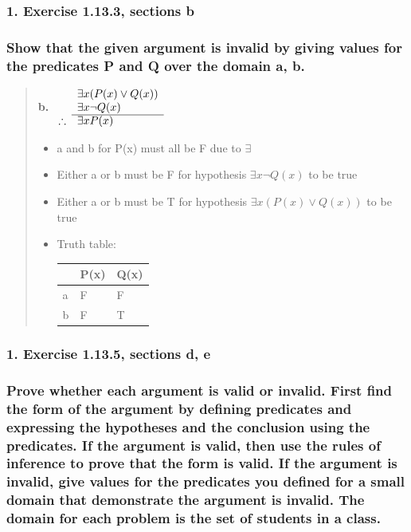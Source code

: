 \documentclass[11pt, oneside]{article}
\begin{document}
\subsubsection*{1. Exercise 1.13.3, sections b}

\subsubsection*{Show that the given argument is invalid by giving values for the predicates P and Q over the domain {a, b}.}

\begin{quote}
    \textbf{b. }
    \(
    \begin{array}{rl}
      & \exists x (P(x) \lor Q(x)) \\
      & \exists x \neg Q(x) \\
      \cline{2-2}
    \therefore & \exists x P(x)  
    \end{array}
    \)  
    
    \begin{itemize}
        \item a and b for P(x) must all be F due to $\exists$
        \item Either a or b must be F for hypothesis $\exists x \neg Q(x)$ to be true
        \item Either a or b must be T for hypothesis $\exists x (P(x) \lor Q(x))$ to be true
        \item Truth table:
            \begin{tabular}{ |p{0.5cm}|p{1cm}|p{1cm}|  }
                \hline
                \enspace & P(x) & Q(x) \\
                \hline
                a & F & F \\
                b & F & T \\
                \hline
            \end{tabular}
    \end{itemize}
\end{quote}

\pagebreak

\subsubsection*{1. Exercise 1.13.5, sections d, e}

\subsubsection*{Prove whether each argument is valid or invalid. First find the form of the argument by defining predicates and expressing the hypotheses and the conclusion using the predicates. If the argument is valid, then use the rules of inference to prove that the form is valid. If the argument is invalid, give values for the predicates you defined for a small domain that demonstrate the argument is invalid. The domain for each problem is the set of students in a class.}
\end{document}
